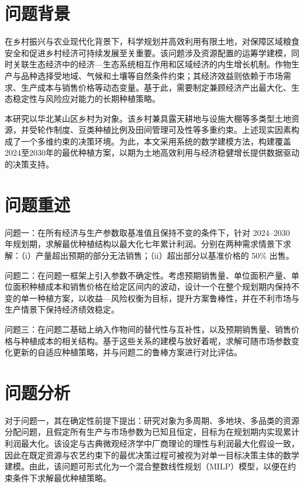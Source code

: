 
\section{问题背景}

在乡村振兴与农业现代化背景下，科学规划并高效利用有限土地，对保障区域粮食安全和促进乡村经济可持续发展至关重要。该问题涉及资源配置的运筹学建模，同时关联生态经济中的经济—生态系统相互作用和区域经济的内生增长机制。作物生产与品种选择受地域、气候和土壤等自然条件约束；其经济效益则依赖于市场需求、生产成本与销售价格等动态变量。基于此，需要制定兼顾经济产出最大化、生态稳定性与风险应对能力的长期种植策略。

本研究以华北某山区乡村为对象。该乡村兼具露天耕地与设施大棚等多类型土地资源，并受轮作制度、豆类种植比例及田间管理可及性等多重约束。上述现实因素构成了一个多维约束的决策环境。为此，本文采用系统的数学建模方法，构建覆盖2024至2030年的最优种植方案，以期为土地高效利用与经济稳健增长提供数据驱动的决策支持。


\section{问题重述}

问题一：在所有经济与生产参数取基准值且保持不变的条件下，针对 2024–2030 年规划期，求解最优种植结构以最大化七年累计利润。分别在两种需求情景下求解：（i）产量超出预期的部分无法销售；（ii）超出部分以基准价格的 50\% 出售。

问题二：在问题一框架上引入参数不确定性。考虑预期销售量、单位面积产量、单位面积种植成本和销售价格在给定区间内的波动，设计一个在整个规划期内保持不变的单一种植方案，以收益—风险权衡为目标，提升方案鲁棒性，并在不利市场与生产情景下保持经济绩效稳定。

问题三：在问题二基础上纳入作物间的替代性与互补性，以及预期销售量、销售价格与种植成本的相关结构。基于这些关系的建模与放好着呢，求解可随市场参数变化更新的自适应种植策略，并与问题二的鲁棒方案进行对比评估。


\section{问题分析}

对于问题一，其在确定性前提下提出：研究对象为多周期、多地块、多品类的资源分配问题，且假定所有生产与市场参数为已知且恒定，目标为在规划期内实现累计利润最大化。该设定与古典微观经济学中厂商理论的理性与利润最大化假设一致，因此在既定资源与农艺约束下的最优决策过程可被视为对单一目标决策主体的数学建模。由此，该问题可形式化为一个混合整数线性规划（MILP）模型，以便在约束条件下求解最优种植策略。

